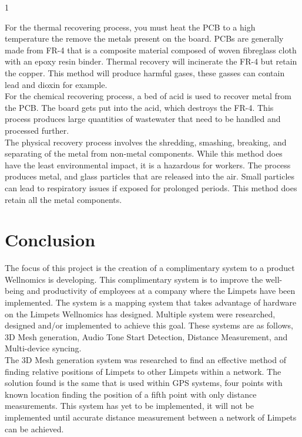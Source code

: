 1\documentclass{article}
\begin{document}
For the thermal recovering process, you must heat the PCB to a high temperature the remove the metals present on the board. PCBs are generally made from FR-4 that is a composite material composed of woven fibreglass cloth with an epoxy resin binder. Thermal recovery will incinerate the FR-4 but retain the copper. This method will produce harmful gases, these gasses can contain lead and dioxin for example.\\

For the chemical recovering process, a bed of acid is used to recover metal from the PCB. The board gets put into the acid, which destroys the FR-4. This process produces large quantities of wastewater that need to be handled and processed further.\\

The physical recovery process involves the shredding, smashing, breaking, and separating of the metal from non-metal components. While this method does have the least environmental impact,
it is a hazardous for workers. The process produces metal, and glass particles that are released into the air. Small particles can lead to respiratory issues if exposed for prolonged periods. This method does retain all the metal components.

\pagebreak
\section{Conclusion}
The focus of this project is the creation of a complimentary system to a product Wellnomics is developing. This complimentary system is to improve the well-being and productivity of employees at a company where the Limpets have been implemented. The system is a mapping system that takes advantage of hardware on the Limpets Wellnomics has designed. Multiple system were researched, designed and/or implemented to achieve this goal. These systems are as follows, 3D Mesh generation, Audio Tone Start Detection, Distance Measurement, and Multi-device syncing.\\

The 3D Mesh generation system was researched to find an effective method of finding relative positions of Limpets to other Limpets within a network. The solution found is the same that is used within GPS systems, four points with known location finding the position of a fifth point with only distance measurements. This system has yet to be implemented, it will not be implemented until accurate distance measurement between a network of Limpets can be achieved.\\
\end{document}
